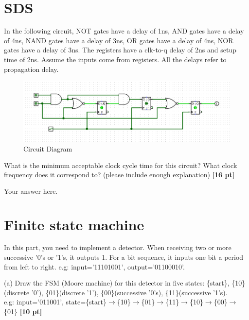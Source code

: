 \documentclass[a4paper]{article}
\begin{document}
\newpage
\section{SDS}
In the following circuit, NOT gates have a delay of 1ns, AND gates have a delay of 4ns, NAND gates have a delay of 3ns, OR gates have a delay of 4ns, NOR gates have a delay of 3ns. The registers have a clk-to-q delay of 2ns and setup time of 2ns. Assume the inputs
come from registers. All the delays refer to propagation delay.\\

\begin{figure}[hp]
    \centering
    \includegraphics[width=1.0\textwidth]{Q2.png}
    \caption{Circuit Diagram}
    \label{fig:q2}
\end{figure}

What is the minimum acceptable clock cycle time for this circuit? What
clock frequency does it correspond to? (please include enough explanation) \textbf{[16 pt]}

\begin{answer}[Question 2]
    Your answer here. \\
\end{answer}

\newpage
\section{Finite state machine}
In this part, you need to implement a detector. When receiving two or more successive '0's or '1's, it outputs 1. For a bit sequence, it inputs one bit a period from left to right. e.g: input='11101001', output='01100010'.

(a) Draw the FSM (Moore machine) for this detector in five states: \{start\}, \{10\}(discrete '0'), \{01\}(discrete '1'), \{00\}(successive '0's), \{11\}(successive '1's). \\
e.g: input='011001', state=\{start\}$\xrightarrow{}$\{10\}$\xrightarrow{}$\{01\}$\xrightarrow{}$\{11\}$\xrightarrow{}$\{10\}$\xrightarrow{}$\{00\}$\xrightarrow{}$\{01\} \textbf{[10 pt]}
\end{document}
